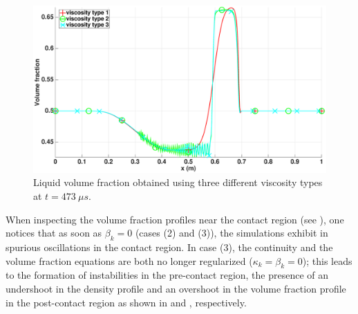 %
\begin{figure}[H]
        \centering
        \includegraphics[width=\textwidth]{figures/relaxation_liquid_vf_multiple_visc.eps}
        \caption{Liquid volume fraction obtained using three different viscosity types at $t=473 \ \mu s$.}
        \label{fig:liq-vf}
\end{figure}
%
When inspecting the volume fraction profiles near the contact region (see ), one notices that as soon as $\beta_k=0$ 
(cases (2) and (3)), the simulations exhibit in spurious oscillations in the contact region. 
In case (3), the continuity and the volume fraction equations are both no longer regularized ($\kappa_k=\beta_k=0$); this leads to 
the formation of instabilities in the pre-contact region, the presence of an undershoot in the density profile and an overshoot in the volume fraction profile in the post-contact region as shown in  and , respectively. 

%
